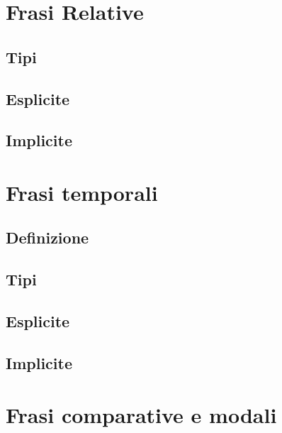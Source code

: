 \documentclass[
  a4paper,
  twoside,
  11pt,
  chapterprefix=false,
  bibliography=totocnumbered,
  listof=flat]{scrbook}
\begin{document}
\hypertarget{frasi-relative}{%
\chapter{Frasi Relative}\label{frasi-relative}}

\hypertarget{tipi}{%
\section{Tipi}\label{tipi}}

\hypertarget{esplicite}{%
\section{Esplicite}\label{esplicite}}

\hypertarget{implicite}{%
\section{Implicite}\label{implicite}}

\hypertarget{frasi-temporali}{%
\chapter{Frasi temporali}\label{frasi-temporali}}

\hypertarget{definizione}{%
\section{Definizione}\label{definizione}}

\hypertarget{tipi-1}{%
\section{Tipi}\label{tipi-1}}

\hypertarget{esplicite-1}{%
\section{Esplicite}\label{esplicite-1}}

\hypertarget{implicite-1}{%
\section{Implicite}\label{implicite-1}}

\hypertarget{frasi-comparative-e-modali}{%
\chapter{Frasi comparative e modali}\label{frasi-comparative-e-modali}}
\end{document}
